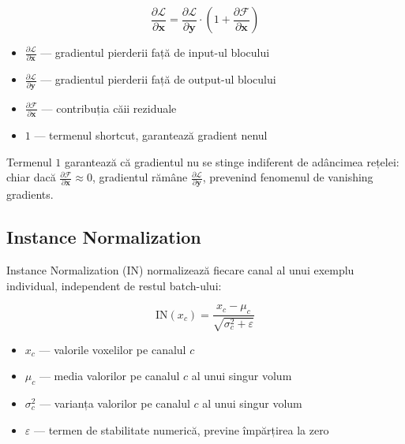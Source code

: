 \documentclass[12pt, a4paper]{report}
\begin{document}
\begin{equation}
    \frac{\partial \mathcal{L}}{\partial \mathbf{x}}
    = \frac{\partial \mathcal{L}}{\partial \mathbf{y}}
      \cdot \left(1 + \frac{\partial \mathcal{F}}
                            {\partial \mathbf{x}}\right)
\end{equation}

\begin{itemize}
    \item $\frac{\partial \mathcal{L}}{\partial \mathbf{x}}$ — gradientul pierderii față de input-ul blocului
    \item $\frac{\partial \mathcal{L}}{\partial \mathbf{y}}$ — gradientul pierderii față de output-ul blocului
    \item $\frac{\partial \mathcal{F}}{\partial \mathbf{x}}$ — contribuția căii reziduale
    \item $1$ — termenul shortcut, garantează gradient nenul
\end{itemize}


Termenul $1$ garantează că gradientul nu se stinge indiferent de
adâncimea rețelei: chiar dacă
$\frac{\partial \mathcal{F}}{\partial \mathbf{x}} \approx 0$,
gradientul rămâne $\frac{\partial \mathcal{L}}{\partial \mathbf{y}}$,
prevenind fenomenul de vanishing gradients.


\subsection{Instance Normalization}

Instance Normalization (IN) normalizează fiecare canal al unui
exemplu individual, independent de restul batch-ului:

\begin{equation}
    \text{IN}(x_c)
    = \frac{x_c - \mu_c}{\sqrt{\sigma_c^2 + \varepsilon}}
\end{equation}

\begin{itemize}
    \item $x_c$ — valorile voxelilor pe canalul $c$
    \item $\mu_c$ — media valorilor pe canalul $c$ al unui singur volum
    \item $\sigma_c^2$ — varianța valorilor pe canalul $c$ al unui singur volum
    \item $\varepsilon$ — termen de stabilitate numerică, previne împărțirea la zero
\end{itemize}
\end{document}
